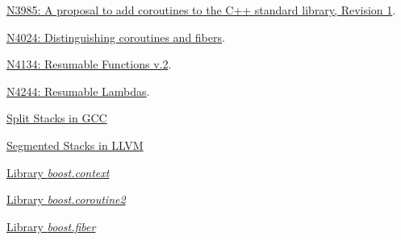 \newpage
{}
\begin{thebibliography}{99}

        \href{http://www.open-std.org/jtc1/sc22/wg21/docs/papers/2014/n3985.pdf}
        {N3985: A proposal to add coroutines to the C++ standard library, Revision 1}.

        \href{http://www.open-std.org/jtc1/sc22/wg21/docs/papers/2014/n4024.pdf}
        {N4024: Distinguishing coroutines and fibers}.

        \href{http://www.open-std.org/jtc1/sc22/wg21/docs/papers/2014/n4134.pdf}
        {N4134: Resumable Functions v.2}.

        \href{http://www.open-std.org/jtc1/sc22/wg21/docs/papers/2014/n4244.pdf}
        {N4244: Resumable Lambdas}.

        \href{http://gcc.gnu.org/wiki/SplitStacks}
        {Split Stacks in GCC}

        \href{http://llvm.org/releases/3.0/docs/SegmentedStacks.html}
        {Segmented Stacks in LLVM}

        \href{https://github.com/boostorg/context}
        {Library \textit{boost.context}}

        \href{https://github.com/boostorg/coroutine2}
        {Library \textit{boost.coroutine2}}

        \href{https://github.com/olk/boost-fiber}
        {Library \textit{boost.fiber}}

\end{thebibliography}
